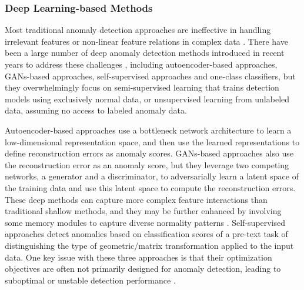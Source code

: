 \documentclass[10pt,journal,compsoc]{IEEEtran}
\begin{document}
\subsubsection{Deep Learning-based Methods}
Most traditional anomaly detection approaches are ineffective in handling irrelevant features or non-linear feature relations in complex data \cite{chandola2009anomaly,aggarwal2017outlieranalysis,liu2012iforest,pang2018sparse}. There have been a large number of deep anomaly detection methods introduced in recent years to address these challenges \cite{pang2021deep}, including autoencoder-based approaches, GANs-based approaches, self-supervised approaches and  one-class classifiers, but they overwhelmingly focus on semi-supervised learning that trains detection models using exclusively normal data, or unsupervised learning from unlabeled data,
assuming no access to labeled anomaly data. 

Autoencoder-based approaches \cite{hawkins2002autoencoder,chen2017autoencoder,zhou2017autoencoder} use a bottleneck network architecture to learn a low-dimensional representation space, and then use the learned representations to define reconstruction errors as anomaly scores. GANs-based approaches \cite{schlegl2017gan,akcay2018ganomaly} also use the reconstruction error as an anomaly score, but they leverage two competing networks, a generator and a discriminator, to adversarially learn a latent space of the training data and use this latent space to compute the reconstruction errors. These deep methods can capture more complex feature interactions than traditional shallow methods, and they may be further enhanced by involving some memory modules to capture diverse normality patterns \cite{gong2019memorizing,park2020learning}. Self-supervised approaches \cite{golan2018deep,wang2019effective,bergman2020classification,georgescu2021anomaly} detect anomalies based on classification scores of a pre-text task of distinguishing the type of geometric/matrix transformation applied to the input data. One key issue with these three approaches is that their optimization objectives are often not primarily designed for anomaly detection, leading to suboptimal or unstable detection performance \cite{pang2018repen,ruff2018deepsvdd,ruff2020deep}. 
\end{document}
